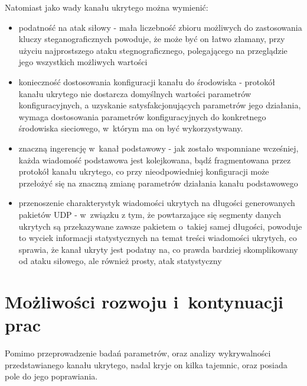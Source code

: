 \documentclass[a4paper, twoside, 12pt]{report}
\begin{document}
    Natomiast jako wady kanału ukrytego można wymienić:
    \begin{itemize}
        \item podatność na atak siłowy - mała liczebność zbioru możliwych do zastosowania
            kluczy steganograficznych powoduje, że może być on łatwo złamany,
            przy użyciu najprostszego ataku stegnograficznego, polegającego
            na przeglądzie jego wszystkich możliwych wartości
        \item konieczność dostosowania konfiguracji kanału do środowiska - protokół
            kanału ukrytego nie dostarcza domyślnych wartości parametrów konfiguracyjnych, a
            uzyskanie satysfakcjonujących parametrów jego działania, wymaga dostosowania
            parametrów konfiguracyjnych do konkretnego środowiska sieciowego,
            w~którym ma on być wykorzystywany.
        \item znaczną ingerencję w~kanał podstawowy - jak zostało wspomniane wcześniej,
            każda wiadomość podstawowa jest kolejkowana, bądź fragmentowana przez
            protokół kanału ukrytego, co przy nieodpowiedniej konfiguracji może
            przełożyć się na znaczną zmianę parametrów działania kanału podstawowego
        \item przenoszenie charakterystyk wiadomości ukrytych na długości generowanych pakietów UDP -
            w~związku z tym, że powtarzające się segmenty danych ukrytych są przekazywane
            zawsze pakietem o~takiej samej długości, powoduje to wyciek informacji
            statystycznych na temat treści wiadomości ukrytych, co sprawia, że
            kanał ukryty jest podatny na, co prawda bardziej skomplikowany od ataku siłowego,
            ale również prosty, atak statystyczny

    \end{itemize}
\chapter{Możliwości rozwoju i~kontynuacji prac}
    Pomimo przeprowadzenie badań parametrów, oraz analizy wykrywalności przedstawianego kanału
    ukrytego, nadal kryje on kilka tajemnic, oraz posiada pole do jego poprawiania.
\end{document}
